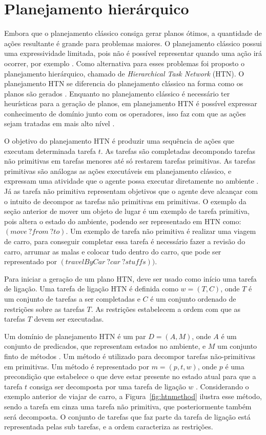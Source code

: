 \section{Planejamento hierárquico} 


Embora que o planejamento clássico consiga gerar planos ótimos, a quantidade de ações resultante é grande para problemas maiores. O planejamento clássico possui uma expressividade limitada, pois não é possível representar quando uma ação irá ocorrer, por exemplo \cite{intelligence2003modern}.
Como alternativa para esses problemas foi proposto o planejamento hierárquico, chamado de \textit{Hierarchical Task Network} (HTN). 
O planejamento HTN se diferencia do planejamento clássico na forma como os planos são gerados \cite{ghallab2004automated}. 
Enquanto no planejamento clássico é necessário ter heurísticas para a geração de planos, em planejamento HTN é possível expressar conhecimento de domínio junto com os operadores, isso faz com que as ações sejam tratadas em mais alto nível \cite{intelligence2003modern}.  

O objetivo do planejamento HTN é produzir uma sequência de ações que executam determinada tarefa $t$. 
As tarefas são completadas decompondo tarefas não primitivas em tarefas menores até só restarem tarefas primitivas.  
As tarefas primitivas são análogas as ações executáveis em planejamento clássico, e expressam uma atividade que o agente possa executar diretamente no ambiente \cite{intelligence2003modern}. 
Já as tarefa não primitiva representam objetivos que o agente deve alcançar com o intuito de decompor as tarefas não primitivas em primitivas.
O exemplo da seção anterior de mover um objeto de lugar é um exemplo de tarefa primitiva, pois altera o estado do ambiente, podendo ser representado em HTN como: $(move~ ?from~ ?to)$. 
Um exemplo de tarefa não primitiva é realizar uma viagem de carro, para conseguir completar essa tarefa é necessário fazer a revisão do carro, arrumar as malas e colocar tudo dentro do carro, que pode ser representado por $(travelByCar ~?car~ ?stuffs))$. 

Para iniciar a geração de um plano HTN, deve ser usado como início uma tarefa de ligação. 
Uma tarefa de ligação HTN é definida como $w = (T, C)$, onde $T$ é um conjunto de tarefas a ser completadas e $C$ é um conjunto ordenado de restrições sobre as tarefas $T$. 
As restrições estabelecem a ordem com que as tarefas $T$ devem ser executadas. 

Um domínio de planejamento HTN é um par $D = (A, M)$, onde $A$ é um conjunto de predicados, que representam estados no ambiente, e $M$ um conjunto finto de métodos \cite{meneguzzi2015planning}. 
Um método é utilizado para decompor tarefas não-primitivas em primitivas. 
Um método é representado por $m = (p, t, w)$, onde $p$ é uma precondição que estabelece o que deve estar presente no estado atual para que a tarefa $t$ consiga ser decomposta por uma tarefa de ligação $w$ \cite{ghallab2004automated}. 
Considerando o exemplo anterior de viajar de carro, a Figura~\ref{fig:htnmethod} ilustra esse método, sendo a tarefa em cinza uma tarefa não primitiva, que posteriormente também será decomposta. 
O conjunto de tarefas que faz parte da tarefa de ligação está representada pelas sub tarefas, e a ordem caracteriza as restrições. 

